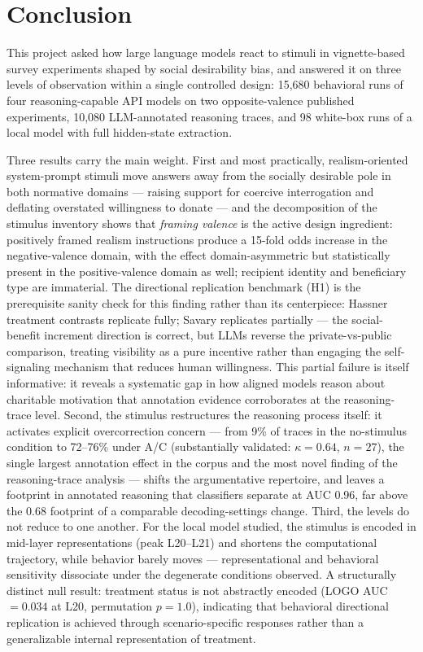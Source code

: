 \documentclass[14pt,a4paper]{extarticle}
\begin{document}
\section{Conclusion}

This project asked how large language models react to stimuli in vignette-based survey experiments shaped by social desirability bias, and answered it on three levels of observation within a single controlled design: 15{,}680 behavioral runs of four reasoning-capable API models on two opposite-valence published experiments, 10{,}080 LLM-annotated reasoning traces, and 98 white-box runs of a local model with full hidden-state extraction.

Three results carry the main weight. First and most practically, realism-oriented system-prompt stimuli move answers away from the socially desirable pole in both normative domains --- raising support for coercive interrogation and deflating overstated willingness to donate --- and the decomposition of the stimulus inventory shows that \emph{framing valence} is the active design ingredient: positively framed realism instructions produce a 15-fold odds increase in the negative-valence domain, with the effect domain-asymmetric but statistically present in the positive-valence domain as well; recipient identity and beneficiary type are immaterial. The directional replication benchmark (H1) is the prerequisite sanity check for this finding rather than its centerpiece: Hassner treatment contrasts replicate fully; Savary replicates partially --- the social-benefit increment direction is correct, but LLMs reverse the private-vs-public comparison, treating visibility as a pure incentive rather than engaging the self-signaling mechanism that reduces human willingness. This partial failure is itself informative: it reveals a systematic gap in how aligned models reason about charitable motivation that annotation evidence corroborates at the reasoning-trace level. Second, the stimulus restructures the reasoning process itself: it activates explicit overcorrection concern --- from 9\% of traces in the no-stimulus condition to 72--76\% under A/C (substantially validated: $\kappa = 0.64$, $n = 27$), the single largest annotation effect in the corpus and the most novel finding of the reasoning-trace analysis --- shifts the argumentative repertoire, and leaves a footprint in annotated reasoning that classifiers separate at AUC 0.96, far above the 0.68 footprint of a comparable decoding-settings change. Third, the levels do not reduce to one another. For the local model studied, the stimulus is encoded in mid-layer representations (peak L20--L21) and shortens the computational trajectory, while behavior barely moves --- representational and behavioral sensitivity dissociate under the degenerate conditions observed. A structurally distinct null result: treatment status is not abstractly encoded (LOGO AUC $= 0.034$ at L20, permutation $p = 1.0$), indicating that behavioral directional replication is achieved through scenario-specific responses rather than a generalizable internal representation of treatment.
\end{document}
